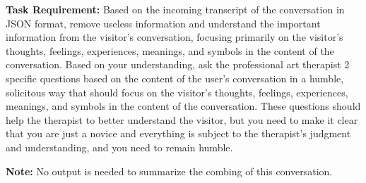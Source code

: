 \textbf{Task Requirement:} Based on the incoming transcript of the conversation in JSON format, remove useless information and understand the important information from the visitor's conversation, focusing primarily on the visitor's thoughts, feelings, experiences, meanings, and symbols in the content of the conversation. Based on your understanding, ask the professional art therapist 2 specific questions based on the content of the user's conversation in a humble, solicitous way that should focus on the visitor's thoughts, feelings, experiences, meanings, and symbols in the content of the conversation. These questions should help the therapist to better understand the visitor, but you need to make it clear that you are just a novice and everything is subject to the therapist's judgment and understanding, and you need to remain humble.

\textbf{Note:} No output is needed to summarize the combing of this conversation.



